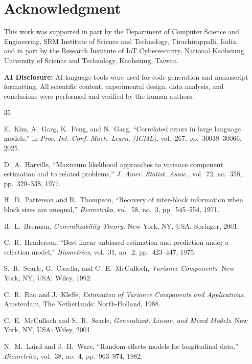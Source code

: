 \documentclass[11pt]{article}
\theoremstyle{definition}
\theoremstyle{plain}
\begin{document}
\section*{Acknowledgment}
This work was supported in part by the Department of Computer Science and Engineering, SRM Institute of Science and Technology, Tiruchirappalli, India, and in part by the Research Institute of IoT Cybersecurity, National Kaohsiung University of Science and Technology, Kaohsiung, Taiwan.

\textbf{AI Disclosure:} AI language tools were used for code generation and manuscript formatting. All scientific content, experimental design, data analysis, and conclusions were performed and verified by the human authors.

\begin{thebibliography}{35}

 E.~Kim, A.~Garg, K.~Peng, and N.~Garg, ``Correlated errors in
large language models,'' in \emph{Proc. Int. Conf. Mach. Learn. (ICML)},
vol.~267, pp.~30038--30066, 2025.

 D.~A.~Harville, ``Maximum likelihood approaches to variance
component estimation and to related problems,'' \emph{J. Amer. Statist. Assoc.},
vol.~72, no.~358, pp.~320--338, 1977.

 H.~D.~Patterson and R.~Thompson, ``Recovery of
inter-block information when block sizes are unequal,'' \emph{Biometrika},
vol.~58, no.~3, pp.~545--554, 1971.

 R.~L.~Brennan, \emph{Generalizability Theory}. New York, NY,
USA: Springer, 2001.

 C.~R.~Henderson, ``Best linear unbiased estimation and
prediction under a selection model,'' \emph{Biometrics}, vol.~31, no.~2,
pp.~423--447, 1975.

 S.~R.~Searle, G.~Casella, and C.~E.~McCulloch,
\emph{Variance Components}. New York, NY, USA: Wiley, 1992.

 C.~R.~Rao and J.~Kleffe, \emph{Estimation of Variance
Components and Applications}. Amsterdam, The Netherlands: North-Holland, 1988.

 C.~E.~McCulloch and S.~R.~Searle, \emph{Generalized,
Linear, and Mixed Models}. New York, NY, USA: Wiley, 2001.

 N.~M.~Laird and J.~H.~Ware, ``Random-effects models for
longitudinal data,'' \emph{Biometrics}, vol.~38, no.~4, pp.~963--974, 1982.


\end{thebibliography}
\end{document}

